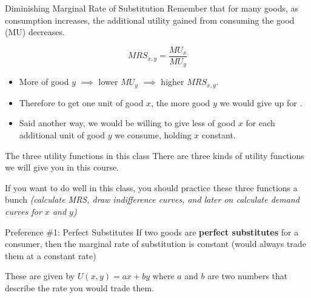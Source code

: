 \documentclass[12pt,t]{beamer}
\begin{document}
\begin{frame}{Diminishing Marginal Rate of Substitution}
  Remember that for many goods, as consumption increases, the additional utility gained from consuming the good (MU) decreases.

  $$
    MRS_{x,y} = \frac{MU_x}{MU_{y}}
  $$
  
  \begin{itemize}
    \item More of good $y$ $\implies$ lower $MU_{y}$ $\implies$ higher $MRS_{x,y}$. 
    
    \pause
    \item Therefore to get one unit of good $x$, the more good $y$ we would give up for . 

    \item Said another way, we would be willing to give less of good $x$ for each additional unit of good $y$ we consume, holding $x$ constant.
  \end{itemize}
\end{frame}

\begin{frame}{The three utility functions in this class}
  There are three kinds of utility functions we will give you in this course. 
  
  \bigskip\bigskip
  If you want to do well in this class, you should practice these three functions a bunch \emph{(calculate MRS, draw indifference curves, and later on calculate demand curves for $x$ and $y$)}
\end{frame}

\begin{frame}{Preference \#1: Perfect Substitutes}
  If two goods are \textbf{perfect substitutes} for a consumer, then the marginal rate of substitution is constant (would always trade them at a constant rate)

  \bigskip
  These are given by $U(x,y) = ax + by$ where $a$ and $b$ are two numbers that describe the rate you would trade them.
\end{frame}
\end{document}
